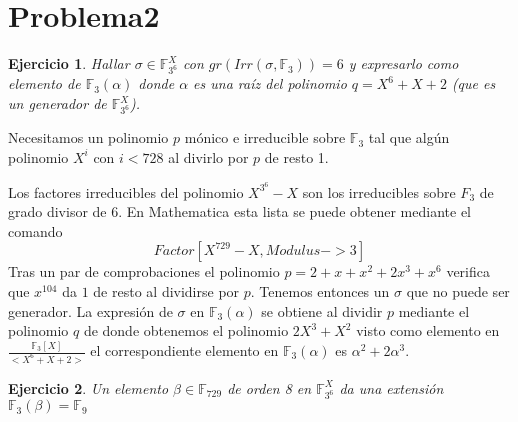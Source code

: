 \documentclass{article}
\theoremstyle{theorem-style}  %
\theoremstyle{definition-style}
\theoremstyle{example-style}
\newtheorem{exercise}{Ejercicio}[section]
\begin{document}
\makeatletter\renewcommand{\ALG@name}{Algoritmo}

\maketitle




%
\section{Problema2}

\begin{exercise}
	Hallar $\sigma \in \mathbb{F}_{3^6}^X$ con $gr(Irr(\sigma,\mathbb{F}_3)) = 6$ y expresarlo como elemento de $\mathbb{F}_3(\alpha)$ donde $\alpha$ es una raíz del polinomio $q = X^6 + X + 2$ (que es un generador de $\mathbb{F}_{3^6}^X$).
\end{exercise}

Necesitamos un polinomio $p$ mónico e irreducible sobre $\mathbb{F}_3$ tal que algún polinomio $X^{i}$ con $i < 728$ al divirlo por $p$ de resto 1. 

Los factores irreducibles del polinomio $X^{3^6} - X$ son los irreducibles sobre $F_3$ de grado divisor de $6$. En Mathematica esta lista se puede obtener mediante el comando $$Factor[X^{729} - X, Modulus -> 3]$$ Tras un par de comprobaciones el polinomio $p = 2+x+x^2+2x^3+x^6$ verifica que $x^{104}$  da $1$ de resto al dividirse por $p$. Tenemos entonces un $\sigma$ que no puede ser generador. La expresión de $\sigma$ en $\mathbb{F}_3(\alpha)$ se obtiene al dividir $p$ mediante el polinomio $q$ de donde obtenemos el polinomio $2X^3+X^2$ visto como elemento en $\frac{\mathbb{F}_3[X]}{<X^6+X+2>}$ el correspondiente elemento en $\mathbb{F}_3(\alpha)$ es $\alpha^2+2 \alpha^3$. 

\begin{exercise}
	Un elemento $\beta \in \mathbb{F}_{729}$ de orden 8 en $\mathbb{F}_{3^6}^X$ da una extensión $\mathbb{F}_3(\beta) = \mathbb{F}_9$
\end{exercise}
\end{document}
